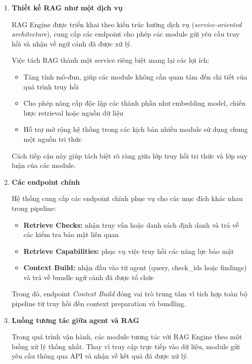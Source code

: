 \begin{enumerate}
    \item \textbf{Thiết kế RAG như một dịch vụ}

    RAG Engine được triển khai theo kiến trúc hướng dịch vụ (\textit{service-oriented architecture}), cung cấp các endpoint cho phép các module gửi yêu cầu truy hồi và nhận về ngữ cảnh đã được xử lý.

    Việc tách RAG thành một service riêng biệt mang lại các lợi ích:
    \begin{itemize}
        \item Tăng tính mô-đun, giúp các module không cần quan tâm đến chi tiết của quá trình truy hồi
        \item Cho phép nâng cấp độc lập các thành phần như embedding model, chiến lược retrieval hoặc nguồn dữ liệu
        \item Hỗ trợ mở rộng hệ thống trong các kịch bản nhiều module sử dụng chung một nguồn tri thức
    \end{itemize}

    Cách tiếp cận này giúp tách biệt rõ ràng giữa lớp truy hồi tri thức và lớp suy luận của các module.

    \item \textbf{Các endpoint chính}

    Hệ thống cung cấp các endpoint chính phục vụ cho các mục đích khác nhau trong pipeline:

    \begin{itemize}
        \item \textbf{Retrieve Checks:} nhận truy vấn hoặc danh sách định danh và trả về các kiểm tra bảo mật liên quan
        \item \textbf{Retrieve Capabilities:} phục vụ việc truy hồi các năng lực bảo mật
        \item \textbf{Context Build:} nhận đầu vào từ agent (query, check\_ids hoặc findings) và trả về bundle ngữ cảnh đã được tổ chức
    \end{itemize}

    Trong đó, endpoint \textit{Context Build} đóng vai trò trung tâm vì tích hợp toàn bộ pipeline từ truy hồi đến context preparation và bundling.

    \item \textbf{Luồng tương tác giữa agent và RAG}

    Trong quá trình vận hành, các module tương tác với RAG Engine theo một luồng xử lý thống nhất. Thay vì truy cập trực tiếp vào dữ liệu, module gửi yêu cầu thông qua API và nhận về kết quả đã được xử lý.


\end{enumerate}

